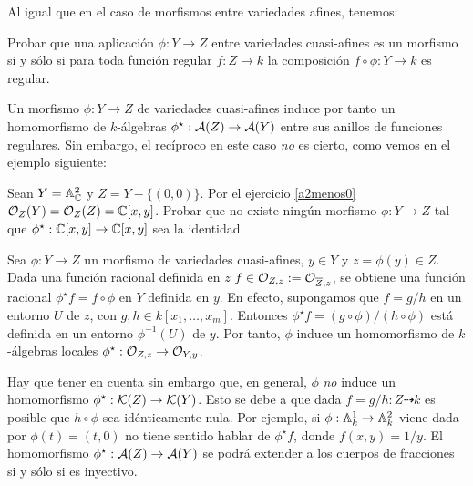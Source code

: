 \documentclass[ACGA.tex]{subfiles}
\begin{document}
Al igual que en el caso de morfismos entre variedades afines, tenemos:
\begin{ejer}
 Probar que una aplicación $\phi:Y\to Z$ entre variedades cuasi-afines es un morfismo si y sólo si para toda función regular $f:Z\to k$ la composición $f\circ\phi:Y\to k$ es regular.
\end{ejer}

Un morfismo $\phi:Y\to Z$ de variedades cuasi-afines induce por tanto un homomorfismo de $k$-álgebras $\phi^\star:\mathcal{A}(Z)\to\mathcal{A}(Y)$ entre sus anillos de funciones regulares. Sin embargo, el recíproco en este caso \emph{no} es cierto, como vemos en el ejemplo siguiente:

\begin{ejer}
 Sean $Y=\mathbb{A}^2_{\mathbb{C}}$ y $Z=Y-\{(0,0)\}$. Por el ejercicio \ref{a2menos0} ${\mathcal O}_{Z}(Y)={\mathcal O}_{Z}(Z)=\mathbb{C}[x,y]$. Probar que no existe ningún morfismo $\phi:Y\to Z$ tal que $\phi^\star:\mathbb{C}[x,y]\to\mathbb{C}[x,y]$ sea la identidad.
\end{ejer}



Sea $\phi:Y\to Z$ un morfismo de variedades cuasi-afines, $y\in Y$ y $z=\phi(y)\in Z$. Dada una función racional definida en $z$  $f\in{\mathcal O}_{Z,z}:={\mathcal O}_{\overline Z,z}$, se obtiene una función racional $\phi^\star f=f\circ\phi$ en $Y$ definida en $y$. En efecto, supongamos que $f=g/h$ en un entorno $U$ de $z$, con $g,h\in k[x_1,\ldots,x_m]$. Entonces $\phi^\star f=(g\circ \phi)/(h\circ\phi)$ está definida en un entorno $\phi^{-1}(U)$ de $y$. Por tanto, $\phi$ induce un homomorfismo de $k$-álgebras locales $\phi^\star:{\mathcal O}_{Z,z}\to{\mathcal O}_{Y,y}$.

Hay que tener en cuenta sin embargo que, en general, $\phi$ \emph{no} induce un homomorfismo $\phi^\star:{\mathcal K}(Z)\to{\mathcal K}(Y)$. Esto se debe a que dada $f=g/h:Z\dashrightarrow k$ es posible que $h\circ\phi$ sea idénticamente nula. Por ejemplo, si $\phi:\mathbb{A}^1_k\to\mathbb{A}^2_k$ viene dada por $\phi(t)=(t,0)$ no tiene sentido hablar de $\phi^\star f$, donde $f(x,y)=1/y$. El homomorfismo $\phi^\star:\mathcal{A}(Z)\to\mathcal{A}(Y)$ se podrá extender a los cuerpos de fracciones si y sólo si es inyectivo.
\end{document}
